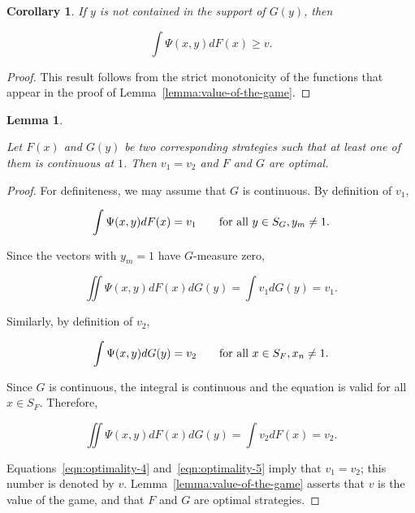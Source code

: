 \documentclass{article}
\newtheorem{corollary}{Corollary}
\newtheorem{lemma}{Lemma}
\begin{document}
\begin{corollary}

If $y$ is not contained in the support of $G(y)$, then

\[
\int \Psi(x, y) dF(x) \geq v.
\]

\end{corollary}

\begin{proof}

This result follows from the strict monotonicity of the functions that appear
in the proof of Lemma~\ref{lemma:value-of-the-game}.

\end{proof}

\begin{lemma} \label{lemma:optimality-of-corresponding-strategies}

Let $F(x)$ and $G(y)$ be two corresponding strategies such that at least one of
them is continuous at $1$. Then $v_1 = v_2$ and $F$ and $G$ are optimal.

\end{lemma}

\begin{proof}

For definiteness, we may assume that $G$ is continuous. By definition of $v_1$,

\[
\int \Psi(x, y) dF(x) = v_1 \qquad \textup{for all } y \in S_G, y_m \neq 1.
\]

Since the vectors with $y_m = 1$ have $G$-measure zero,

\begin{equation}
\iint \Psi(x, y) dF(x) dG(y) = \int v_1 dG(y) = v_1.  \label{eqn:optimality-4}
\end{equation}

Similarly, by definition of $v_2$,

\[
\int \Psi(x, y) dG(y) = v_2 \qquad \textup{for all } x \in S_F, x_n \neq 1.
\]

Since $G$ is continuous, the integral is continuous and the equation is valid
for all $x \in S_F$. Therefore,

\begin{equation}
\iint \Psi(x, y) dF(x) dG(y) = \int v_2 dF(x) = v_2.  \label{eqn:optimality-5}
\end{equation}

Equations~\ref{eqn:optimality-4} and~\ref{eqn:optimality-5} imply that $v_1 =
v_2$; this number is denoted by $v$. Lemma~\ref{lemma:value-of-the-game}
asserts that $v$ is the value of the game, and that $F$ and $G$ are optimal
strategies.

\end{proof}
\end{document}
